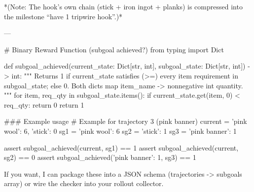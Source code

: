 \begin{ModelTurn}
*(Note: The hook's own chain (stick + iron ingot + planks) is compressed into the milestone ``have 1 tripwire hook''.)*

---

# Binary Reward Function (subgoal achieved?)
from typing import Dict

def subgoal_achieved(current_state: Dict[str, int], subgoal_state: Dict[str, int]) -> int:
    """
    Returns 1 if current_state satisfies (>=) every item requirement in subgoal_state; else 0.
    Both dicts map item_name -> nonnegative int quantity.
    """
    for item, req_qty in subgoal_state.items():
        if current_state.get(item, 0) < req_qty:
            return 0
    return 1

### Example usage
# Example for trajectory 3 (pink banner)
current = {'pink wool': 6, 'stick': 0}
sg1 = {'pink wool': 6}
sg2 = {'stick': 1}
sg3 = {'pink banner': 1}

assert subgoal_achieved(current, sg1) == 1
assert subgoal_achieved(current, sg2) == 0
assert subgoal_achieved({'pink banner': 1}, sg3) == 1

If you want, I can package these into a JSON schema (trajectories -> subgoals array) or wire the checker into your rollout collector.
\end{ModelTurn}
